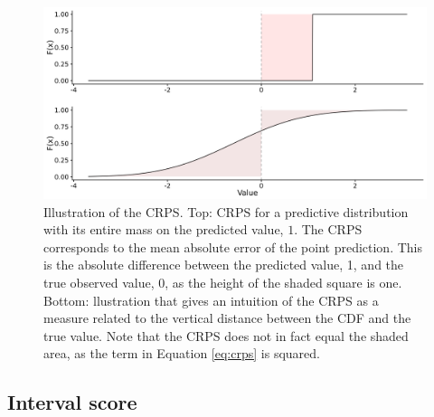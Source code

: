 \documentclass[
]{book}
\begin{document}
\begin{figure}
\includegraphics[width=1\linewidth]{../visualisation/chapter-3-evaluation/crps-explanation} \caption{Illustration of the CRPS. Top: CRPS for a predictive distribution with its entire mass on the predicted value, $1$. The CRPS corresponds to the mean absolute error of the point prediction. This is the absolute difference between the predicted value, 1, and the true observed value, 0, as the height of the shaded square is one. Bottom: llustration that gives an intuition of the CRPS as a measure related to the vertical distance between the CDF and the true value. Note that the CRPS does not in fact equal the shaded area, as the term in Equation \eqref{eq:crps} is squared.}\label{fig:crps-explanation}
\end{figure}

\hypertarget{interval-score}{%
\subsection{Interval score}\label{interval-score}}
\end{document}
